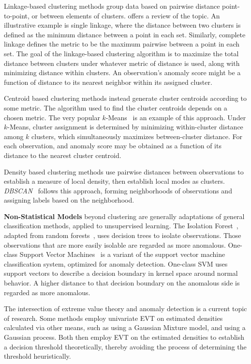 Linkage-based clustering methods group data based on pairwise distance 
    point-to-point, or between elements of clusters.  \cite{ackerman2010} offers
    a review of the topic.  An illustrative example is single linkage, where 
    the distance between two clusters is defined as the minimum distance 
    between a point in each set.   Similarly, complete linkage defines the 
    metric to be the maximum pairwise between a point in each set.  The goal of 
    the linkage-based clustering algorithm is to maximize the total distance 
    between clusters under whatever metric of distance is used, along with 
    minimizing distance within clusters.  An observation's anomaly score might 
    be a function of distance to its nearest neighbor within its assigned 
    cluster.

Centroid based clustering methods instead generate cluster centroids 
    according to some metric.  The algorithm used to find the cluster centroids 
    depends on a chosen metric.  The very popular $k$-Means~\citep{hartigan1979} is
    an example of this approach. Under $k$-Means, cluster assignment is determined 
    by minimizing within-cluster distance among $k$ clusters, which simultaneously 
    maximizes between-cluster distance. For each observation, and anomaly score may be
    obtained as a function of its distance to the nearest cluster centroid.  
    
Density based clustering methods use pairwise distances between observations to 
    establish a measure of local density, then establish local modes as clusters.
    \emph{DBSCAN}~\citep{ester1996} follows this approach, forming neighborhoods 
    of observations and assigning labels based on the neighborhood. 
    
{\bf Non-Statistical Models} beyond clustering are generally adaptations 
    of general classification methods, applied to unsupervised learning.  
    The Isolation Forest~\citep{liu2000}, adapted from random 
    forests~\citep{breiman2001}, uses decision trees to isolate observations.
    Those observations that are more easily isolable are regarded as more 
    anomalous.  One-class Support Vector Machines~\citep{chang2011} is a variant
    of the support vector machine classification system, optimized for 
    anomaly detection.  One-class SVM uses support vectors to describe a decision 
    boundary in kernel space around normal behavior. A higher distance to 
    that decision boundary on the anomalous side is regarded as more anomalous.
    
The intersection of extreme value theory and anomaly detection is a current 
    topic of research.  Some methods employ univariate EVT on estimated densities
    calculated via other means, such as \cite{clifton2011} using a Gaussian Mixture model, 
    and \cite{gu2021} using a Gaussian process.  Both then employ EVT on the 
    estimated densities to establish a decision threshold theoretically, thereby avoiding
    the process of determining the threshold heuristically.

